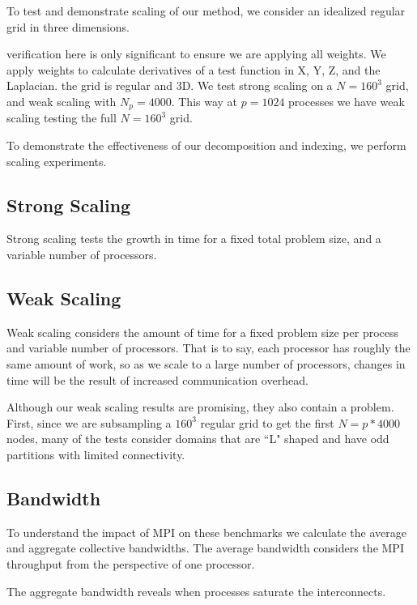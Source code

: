\documentclass{report}
\begin{document}
To test and demonstrate scaling of our method, we consider an idealized regular grid in three dimensions. 

verification here is only significant to ensure we are applying all weights. 
We apply weights to calculate derivatives of a test function in X, Y, Z, and the Laplacian. 
the grid is regular and 3D.
We test strong scaling on a $N=160^3$ grid, and weak scaling with $N_p=4000$. This way at $p=1024$ processes we have weak scaling testing the full $N=160^3$ grid. 



To demonstrate the effectiveness of our decomposition and indexing, we perform scaling experiments. 

\subsection{Strong Scaling}
Strong scaling tests the growth in time for a fixed total problem size, and a variable number of processors. 

\subsection{Weak Scaling}
Weak scaling considers the amount of time for a fixed problem size per process and variable number of processors. That is to say, each processor has roughly the same amount of work, so as we scale to a large number of processors, changes in time will be the result of increased communication overhead. 

Although our weak scaling results are promising, they also contain a problem. First, since we are subsampling a $160^3$ regular grid to get the first $N=p*4000$ nodes, many of the tests consider domains that are ``L" shaped and have odd partitions with limited connectivity.



\subsection{Bandwidth}

To understand the impact of MPI on these benchmarks we calculate the average and aggregate collective bandwidths. The average bandwidth considers the MPI throughput from the perspective of one processor. 

The aggregate bandwidth reveals when processes saturate the interconnects. 
\end{document}
